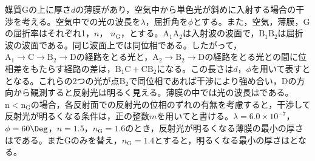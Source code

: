 \hakosyokika
\item
    \begin{mawarikomi}{170pt}{}
        媒質Gの上に厚さ$d$の薄膜があり，空気中から単色光が斜めに入射する場合の干渉を考える。空気中での光の波長を$\lambda $，屈折角を$\phi $とする。また，空気，薄膜，Gの屈折率はそれぞれ1，$n$，
        $n\mathrm{_G}$，とする。$\mathrm{A_1A_2}$は入射波の波面で，$\mathrm{B_1B_2}$は屈折波の波面である。同じ波面上では同位相である。したがって，$\mathrm{A_1}\rightarrow\mathrm{C}\rightarrow \mathrm{B_2}\rightarrow \mathrm{D}$の経路をとる光と，$\mathrm{A_2}\rightarrow \mathrm{B_2}\rightarrow \mathrm{D}$の経路をとる光との間に位相差をもたらす経路の差は，$\mathrm{B_1C+CB_2}$になる。この長さは$d$，$\phi$を用いて表すと\Hako となる。これらの2つの光が点$\mathrm{B_2}$で同位相であれば干渉により強め合い，Dの方向から観測すると反射光は明るく見える。薄膜の中では光の波長は\Hako である。$\mathrm{n<n_G}$の場合，各反射面での反射光の位相のずれの有無を考慮すると，干渉して反射光が明るくなる条件は，正の整数$m$を用いて\Hako と書ける。$\lambda = 6.0\times 10^{-7}$，$\phi = 60\Deg $，$n=1.5$，$n\mathrm{_G}=1.6$のとき，反射光が明るくなる薄膜の最小の厚さは\Hako {}である。またGのみを替え，$n\mathrm{_G}=1.4$とすると，明るくなる最小の厚さは\Hako {}となる。
    \end{mawarikomi}